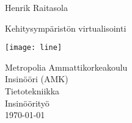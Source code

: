 
\begin{titlepage}
  \thispagestyle{cover}
  \vspace*{0.3 \paperheight}
  
  {\Large Henrik Raitasola}
  
  {\huge Kehitysympäristön virtualisointi}
  \vspace{2cm}

  \begin{adjustwidth}{-8.2cm}{}
    \texttt{[image: line]}
  \end{adjustwidth}
  
  Metropolia Ammattikorkeakoulu \\
  Insinööri (AMK) \\
  Tietotekniikka \\
  Insinöörityö \\
  \today
\end{titlepage}